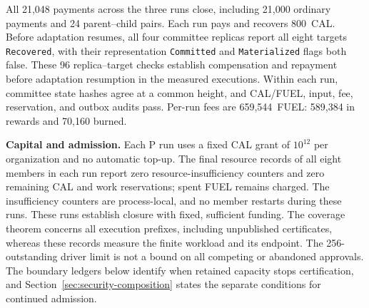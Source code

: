 All 21,048 payments across the three runs close, including
21,000 ordinary payments and 24 parent--child pairs. Each run
pays and recovers 800~CAL. Before adaptation resumes, all four
committee replicas report all eight targets \texttt{Recovered},
with their representation \texttt{Committed} and
\texttt{Materialized} flags both false. These 96 replica--target
checks establish compensation and repayment before adaptation
resumption in the measured executions. Within each run,
committee state hashes agree at a common height, and CAL/FUEL,
input, fee, reservation, and outbox audits pass. Per-run fees are
659,544~FUEL: 589,384 in rewards and 70,160 burned.

\noindent\textbf{Capital and admission.}
Each P run uses a fixed CAL grant of $10^{12}$ per organization and no
automatic top-up. The final resource records of all eight members in each run
report zero resource-insufficiency counters and zero remaining CAL and work
reservations; spent FUEL remains charged. The insufficiency counters are
process-local, and no member restarts during these runs. These runs establish closure with
fixed, sufficient funding. The coverage theorem concerns all execution
prefixes, including unpublished certificates, whereas these records measure
the finite workload and its endpoint. The 256-outstanding driver limit is
not a bound on all competing or abandoned approvals. The boundary ledgers
below identify when retained capacity stops certification, and
Section~\ref{sec:security-composition} states the separate conditions for
continued admission.

